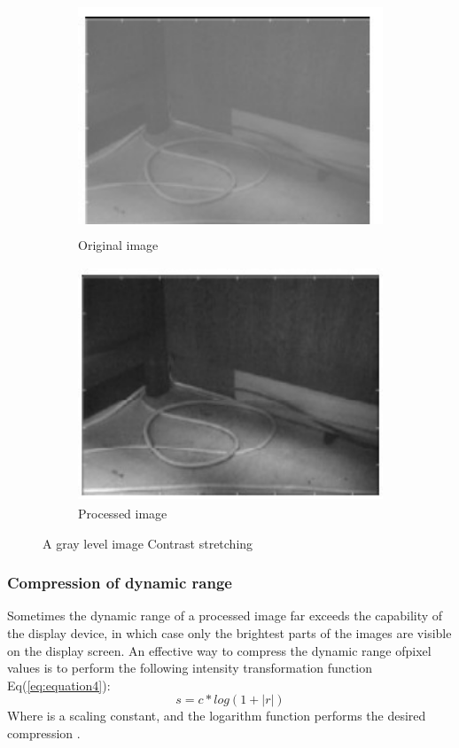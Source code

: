         \begin{figure}[h]
                \centering
                \begin{subfigure}[b]{0.46\textwidth}
                        \centering
                        \includegraphics[width=\textwidth,height=7cm]{chapiter1/figures/constrat-ori.jpg}
                        \caption{Original image}
                \end{subfigure}
                \hfill
                \begin{subfigure}[b]{0.46\textwidth}
                        \centering
                        \includegraphics[width=\textwidth,height=7cm]{chapiter1/figures/constart-processed.jpg}
                        \caption{Processed image}
                \end{subfigure}
                \caption{A gray level image Contrast stretching}
                \label{fig:figure1.10}
        \end{figure}

\subsubsection{Compression of dynamic range}
Sometimes the dynamic range of a processed image far exceeds the capability of the display device,
in which case only the brightest parts of the images are visible on the display screen.
An effective way to compress the dynamic range ofpixel values is to perform the following intensity transformation function Eq(\ref{eq:equation4}):
        \begin{equation}
                s = c * log(1+|r|)
                \label{eq:equation4}
        \end{equation}
Where is a scaling constant, and the logarithm function performs the desired compression \cite{1.12}.

